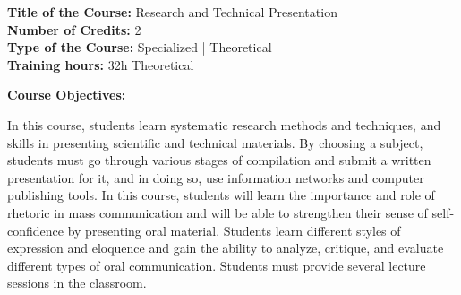 \documentclass[12pt,a4paper]{article}
\begin{document}
\newpage
\textbf{Title of the Course:} Research and Technical Presentation\\
\textbf{Number of Credits:} 2\\
\textbf{Type of the Course:} Specialized | Theoretical\\
\textbf{Training hours:} 32h Theoretical\par\vspace{4pt}
\textbf{Course Objectives:}\par\vspace{2pt}
In this course, students learn systematic research methods and techniques, and skills in presenting
scientific and technical materials. By choosing a subject, students must go through various stages
of compilation and submit a written presentation for it, and in doing so, use information networks
and computer publishing tools. In this course, students will learn the importance and role of
rhetoric in mass communication and will be able to strengthen their sense of self-confidence by
presenting oral material. Students learn different styles of expression and eloquence and gain the
ability to analyze, critique, and evaluate different types of oral communication. Students must
provide several lecture sessions in the classroom.\par\vspace{4pt}
\end{document}
